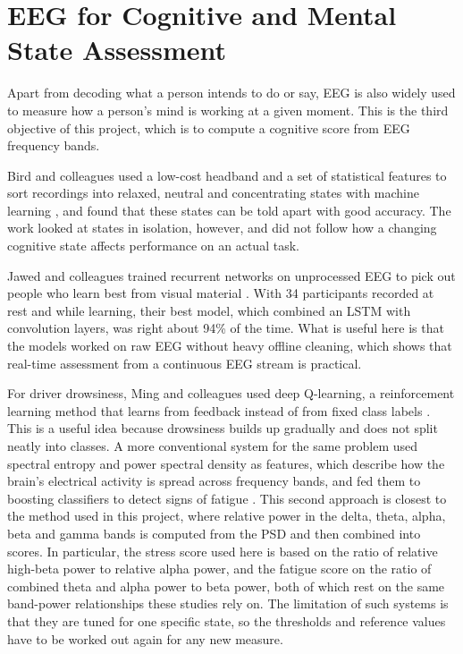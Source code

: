 \section{EEG for Cognitive and Mental State Assessment}

Apart from decoding what a person intends to do or say, EEG is also widely used to measure
how a person's mind is working at a given moment. This is the third objective of this
project, which is to compute a cognitive score from EEG frequency bands.

Bird and colleagues used a low-cost headband and a set of statistical features to sort
recordings into relaxed, neutral and concentrating states with machine learning
\cite{bird2018mental}, and found that these states can be told apart with good accuracy. The work looked at states in isolation, however,
and did not follow how a changing cognitive state affects performance on an actual task.

Jawed and colleagues trained recurrent networks on unprocessed EEG to pick out people who
learn best from visual material \cite{jawed2024visual}. With 34 participants recorded at
rest and while learning, their best model, which combined an LSTM with convolution layers,
was right about 94\% of the time. What is useful here is that the models worked on raw EEG without heavy offline
cleaning, which shows that real-time assessment from a continuous EEG stream is practical.

For driver drowsiness, Ming and colleagues used deep Q-learning, a reinforcement learning
method that learns from feedback instead of from fixed class labels
\cite{ming2021drowsiness}. This is a useful idea because drowsiness builds up gradually and does not
split neatly into classes. A more conventional system for the same problem used spectral
entropy and power spectral density as features, which describe how the brain's electrical
activity is spread across frequency bands, and fed them to boosting classifiers to detect
signs of fatigue \cite{jiri2025drowsiness}. This second approach is closest to the method
used in this project, where relative power in the delta, theta, alpha, beta and gamma bands
is computed from the PSD and then combined into scores. In particular, the stress score used
here is based on the ratio of relative high-beta power to relative alpha power, and the
fatigue score on the ratio of combined theta and alpha power to beta power, both of which
rest on the same band-power relationships these studies rely on. The limitation of such
systems is that they are tuned for one specific state, so the thresholds and reference
values have to be worked out again for any new measure.

